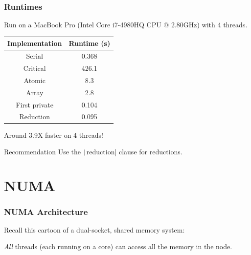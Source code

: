 \documentclass[aspectratio=169]{beamer}
\begin{document}
\begin{frame}
\frametitle{Runtimes}
Run on a MacBook Pro (Intel Core i7-4980HQ CPU @ 2.80GHz) with 4 threads.

\vfill

\begin{table}
\begin{tabular}{cc}
\toprule
Implementation & Runtime (s) \\
\midrule
Serial        & 0.368 \\
Critical      & 426.1 \\
Atomic        & 8.3 \\
Array         & 2.8 \\
First private & 0.104 \\
Reduction     & 0.095 \\
\bottomrule
\end{tabular}
\end{table}

\vfill

Around 3.9X faster on 4 threads!

\vfill


\begin{block}{Recommendation}
Use the \texttt|reduction| clause for reductions.
\end{block}

\end{frame}

\section{NUMA}
\begin{frame}
\frametitle{NUMA Architecture}

Recall this cartoon of a dual-socket, shared memory system:
\begin{center}
\end{center}

\emph{All} threads (each running on a core) can access all the memory in the node.

\end{frame}
\end{document}
